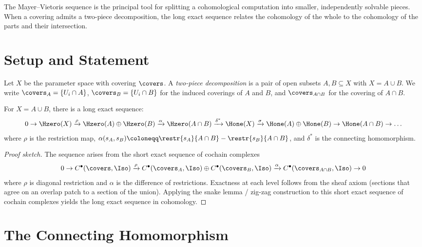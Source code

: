 The Mayer--Vietoris sequence is the principal tool for splitting a
cohomological computation into smaller, independently solvable pieces.
When a covering admits a two-piece decomposition, the long exact
sequence relates the cohomology of the whole to the cohomology of the
parts and their intersection.

\section{Setup and Statement}

\begin{definition}
\label{def:two-piece}
Let $X$ be the parameter space with covering $\covers$.  A
\emph{two-piece decomposition} is a pair of open subsets $A, B
\subseteq X$ with $X = A \cup B$.  We write $\covers_A = \{U_i
\cap A\}$, $\covers_B = \{U_i \cap B\}$ for the induced coverings
of $A$ and $B$, and $\covers_{A \cap B}$ for the covering of
$A \cap B$.
\end{definition}

\begin{theorem}
\label{thm:mv}
For $X = A \cup B$, there is a long exact sequence:
\[
  0 \to \Hzero(X) \xrightarrow{\rho} \Hzero(A) \oplus \Hzero(B)
  \xrightarrow{\alpha} \Hzero(A \cap B)
  \xrightarrow{\delta^*} \Hone(X) \xrightarrow{\sigma} \Hone(A) \oplus \Hone(B)
  \to \Hone(A \cap B) \to \ldots
\]
where $\rho$ is the restriction map, $\alpha(s_A, s_B) \coloneqq
\restr{s_A}{A \cap B} - \restr{s_B}{A \cap B}$, and $\delta^*$
is the connecting homomorphism.
\end{theorem}

\begin{proof}[Proof sketch]
The sequence arises from the short exact sequence of cochain
complexes
\[
  0 \to C^\bullet(\covers, \Iso) \xrightarrow{\rho}
  C^\bullet(\covers_A, \Iso) \oplus C^\bullet(\covers_B, \Iso)
  \xrightarrow{\alpha}
  C^\bullet(\covers_{A\cap B}, \Iso) \to 0
\]
where $\rho$ is diagonal restriction and $\alpha$ is the difference
of restrictions.  Exactness at each level follows from the sheaf
axiom (sections that agree on an overlap patch to a section of
the union).  Applying the snake lemma / zig-zag construction to
this short exact sequence of cochain complexes yields the long
exact sequence in cohomology.
\end{proof}

\section{The Connecting Homomorphism}

